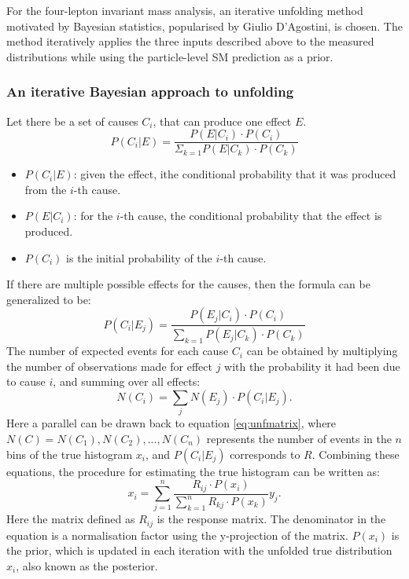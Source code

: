 For the four-lepton invariant mass analysis, an iterative unfolding method motivated by Bayesian statistics, popularised by Giulio D’Agostini, is chosen. The method iteratively applies the three inputs described above to the measured distributions while using the particle-level SM prediction as a prior.

\subsubsection{An iterative Bayesian approach to unfolding}
\label{ssec:bayesianunfolding}
Let there be a set of causes $C_i$, that can produce one effect $E$. 
\begin{equation}
    P(C_i|E)=\dfrac{P(E|C_i)\cdot P(C_i)}{\Sigma_{k=1}P(E|C_k)\cdot P(C_k)}
\end{equation}

\begin{itemize}
    \item $P(C_i|E)$: given the effect, ithe conditional probability that it was produced from the $i$-th cause.
    \item $P(E|C_i)$: for the $i$-th cause, the conditional probability that the effect is produced.
    \item $P(C_i)$ is the initial probability of the $i$-th cause.
\end{itemize}
If there are multiple possible effects for the causes, then the formula can be generalized to be:
\begin{equation}
    P(C_i|E_j)=\dfrac{P(E_j|C_i)\cdot P(C_i)}{\sum_{k=1}P(E_j|C_k)\cdot P(C_k)}
\end{equation}
The number of expected events for each cause $C_i$ can be obtained by multiplying the number of observations made for effect $j$ with the probability it had been due to cause $i$, and summing over all effects:
\begin{equation} \label{eq:numcause}
    N(C_i)=\sum_jN(E_j)\cdot P(C_i|E_j).
\end{equation}
Here a parallel can be drawn back to equation \ref{eq:unfmatrix}, where $N(C)={N(C_1),N(C_2),...,N(C_n)}$ represents the number of events in the $n$ bins of the true histogram $x_i$, and $P(C_i|E_j)$ corresponds to $R$. Combining these equations, the procedure for estimating the true histogram can be written as:
\begin{equation}
    x_i=\sum_{j=1}^n\dfrac{R_{ij}\cdot P(x_i)}{\sum_{k=1}^nR_{kj}\cdot P(x_k)}y_j.
\end{equation}
Here the matrix defined as $R_{ij}$ is the response matrix. The denominator in the equation is a normalisation factor using the y-projection of the matrix. $P(x_i)$ is the prior, which is updated in each iteration with the unfolded true distribution $x_i$, also known as the posterior.

